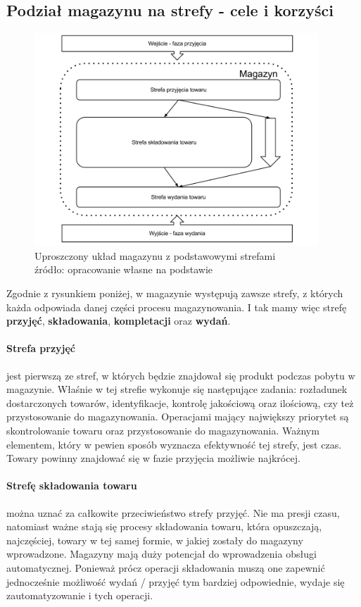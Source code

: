 	\subsection{Podział magazynu na strefy - cele i korzyści}
		\begin{figure}[h]
			\centering
			\includegraphics[width=0.95\textwidth]{images/warehouse_simple_schema}
			\caption[Obszary magazynu - układ uproszczony]{
				Uproszczony układ magazynu z podstawowymi strefami\\
				źródło: opracowanie własne na podstawie \cite{systemyLogistyczne_pfohl}
			}
			\label{c4:warehouse_simple_schema}
		\end{figure}
		Zgodnie z rysunkiem poniżej, w magazynie występują zawsze strefy, z których każda odpowiada danej
		części procesu magazynowania. I tak mamy więc strefę \textbf{przyjęć}, \textbf{składowania}, \textbf{kompletacji} oraz \textbf{wydań}.
		
		\paragraph{Strefa przyjęć} jest pierwszą ze stref, w których będzie znajdował się produkt podczas pobytu w magazynie. 
		Właśnie w tej strefie wykonuje się następujące zadania: rozładunek dostarczonych towarów, identyfikacje, kontrolę jakościową
		oraz ilościową, czy też przystosowanie do magazynowania. Operacjami mający największy priorytet są skontrolowanie
		towaru oraz przystosowanie do magazynowania. Ważnym elementem, który w pewien sposób wyznacza efektywność tej strefy, jest
		czas. Towary powinny znajdować się w fazie przyjęcia możliwie najkrócej.
		\paragraph{Strefę składowania towaru} można uznać za całkowite przeciwieństwo strefy przyjęć. Nie ma presji czasu, 
		natomiast ważne stają się procesy składowania towaru, która opuszczają, najczęściej, towary w tej samej formie,
		w jakiej zostały do magazyny wprowadzone. Magazyny mają duży potencjał do wprowadzenia obsługi automatycznej. 
		Ponieważ prócz operacji składowania muszą one zapewnić jednocześnie możliwość wydań / przyjęć tym bardziej odpowiednie,
		wydaje się zautomatyzowanie i tych operacji. 
